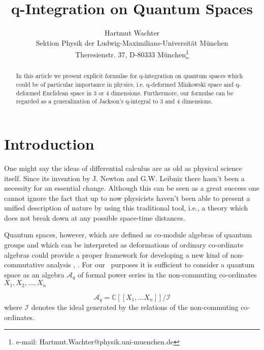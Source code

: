 \documentclass[a4paper,11pt,oneside]{article}
\begin{document}
\author{Hartmut Wachter \\
Sektion Physik der Ludwig-Maximilians-Universit\"{a}t M\"{u}nchen\\
Theresienstr. 37, D-80333 M\"{u}nchen\thanks{%
e-mail: Hartmut.Wachter@physik.uni-muenchen.de}}
\title{q-Integration on Quantum Spaces}
\maketitle

\begin{abstract}
In this article we present explicit formulae for q-integration on quantum
spaces which could be of particular importance in physics, i.e. q-deformed
Minkowski space and q-deformed Euclidean space in 3 or 4 dimensions.
Furthermore, our formulae can be regarded as a generalization of Jackson's
q-integral to 3 and 4 dimensions.
\end{abstract}

\section{Introduction}

One might say the ideas of differential calculus are as old as physical
science itself. Since its invention by J. Newton and G.W. Leibniz there
hasn't been a necessity for an essential change. Although this can be seen
as a great success one cannot ignore the fact that up to now physicists
haven't been able to present a unified description of nature by using this
traditional tool, i.e., a theory which does not break down at any possible
space-time distances.

Quantum spaces, however, which are defined as co-module algebras of quantum
groups and which can be interpreted as deformations of ordinary co-ordinate
algebras \cite{RTF90} could provide a proper framework for developing a new
kind of non-commutative analysis \cite{Wes00}, \cite{Maj93}. For our \
purposes it is sufficient to consider a quantum space as an algebra $%
\mathcal{A}_{q}$ of formal power series in the non-commuting co-ordinates $%
X_{1},X_{2},\ldots ,X_{n}$

\begin{equation}
\mathcal{A}_{q}=\mathbb{C}\left[ \left[ X_{1},\ldots X_{n}\right] \right] /%
\mathcal{I}
\end{equation}
where $\mathcal{I}$ denotes the ideal generated by the relations of the
non-commuting co-ordinates.
\end{document}
